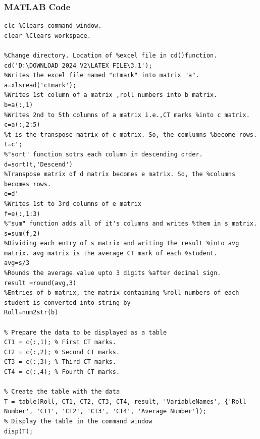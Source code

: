 \documentclass[a4paper,12pt]{article}
\begin{document}
\subsubsection{MATLAB Code}
\begin{lstlisting}[style=vscode-light, caption={Calculating Average Test Marks Using Matrices} ]
clc %Clears command window.
clear %Clears workspace.

%Change directory. Location of %excel file in cd()function.
cd('D:\DOWNLOAD 2024 V2\LATEX FILE\3.1');
%Writes the excel file named "ctmark" into matrix "a".
a=xlsread('ctmark'); 
%Writes 1st column of a matrix ,roll numbers into b matrix.
b=a(:,1)
%Writes 2nd to 5th columns of a matrix i.e.,CT marks %into c matrix.
c=a(:,2:5)
%t is the transpose matrix of c matrix. So, the comlumns %become rows.
t=c'; 
%"sort" function sotrs each column in descending order.
d=sort(t,'Descend') 
%Transpose matrix of d matrix becomes e matrix. So, the %columns becomes rows.
e=d' 
%Writes 1st to 3rd columns of e matrix
f=e(:,1:3) 
%"sum" function adds all of it's columns and writes %them in s matrix. 
s=sum(f,2)
%Dividing each entry of s matrix and writing the result %into avg matrix. avg matrix is the average CT mark of each %student.
avg=s/3 
%Rounds the average value upto 3 digits %after decimal sign.
result =round(avg,3)
%Entries of b matrix, the matrix containing %roll numbers of each student is converted into string by
Roll=num2str(b) 

% Prepare the data to be displayed as a table
CT1 = c(:,1); % First CT marks.
CT2 = c(:,2); % Second CT marks.
CT3 = c(:,3); % Third CT marks.
CT4 = c(:,4); % Fourth CT marks.

% Create the table with the data
T = table(Roll, CT1, CT2, CT3, CT4, result, 'VariableNames', {'Roll Number', 'CT1', 'CT2', 'CT3', 'CT4', 'Average Number'});
% Display the table in the command window
disp(T);



\end{lstlisting}
\end{document}
